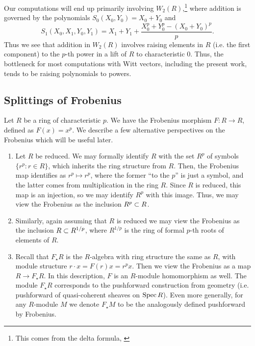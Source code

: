 \begin{rmk}
	\label{rmk:polyraise:w2}
    Our computations will end up primarily involving
    \(W_{2}(R)\),\footnote{
    This comes from the delta formula,
    \cite[Theorem~D]{kty-2022-fedder}}
    where addition is governed by the polynomials
	\(S_{0}(X_{0}, Y_{0}) = X_{0} + Y_{0}\)
	and
	\[
		S_{1}(X_{0}, X_{1}, Y_{0}, Y_{1})
		= X_{1} + Y_{1} + 
		\frac{X_{0}^{p} + Y_{0}^{p} - (X_{0} + Y_{0})^{p}}{p}
	.\]
	Thus we see that addition in \(W_{2}(R)\) involves raising
	elements in \(R\) (i.e. the first component) to the \(p\)-th
	power in a lift of \(R\) to characteristic 0.
    Thus, the bottleneck for most computations with Witt vectors,
    including the present work, tends to be raising
    polynomials to powers.
\end{rmk}

\subsection{Splittings of Frobenius}
\label{subsec:split:frob}

Let \(R\) be a ring of characteristic \(p\).
We have the Frobenius morphism
\(F \colon R \xrightarrow{} R\),
defined as \(F(x) = x^p\).
We describe a few alternative perspectives on
the Frobenius which will be useful later.

\begin{rmk}
	\label{rmk:frob:perspectives}
    \hfill
    \begin{enumerate}[(1)]
    	\item Let \(R\) be reduced.
            We may formally identify \(R\) with the set \(R^{p}\)
            of symbols \(\{r^{p} : r \in R\}\),
            which inherits the ring structure from \(R\).
            Then, the Frobenius map identifies as
            \(r^{p} \mapsto r^{p}\), where the former
            ``to the \(p\)'' is just a symbol, and the
            latter comes from multiplication in the ring \(R\).
            Since \(R\) is reduced, this map is an injection,
            so we may identify \(R^{p}\) with this image.
    		Thus, we may view the Frobenius as the inclusion
    		\(R^{p} \subset R\).
    	\item
            Similarly, again assuming that \(R\) is reduced
    		we may view the Frobenius as the inclusion
    		\(R \subset R^{1 / p}\), where \(R^{1 / p}\)
    		is the ring of formal \(p\)-th roots of elements
    		of \(R\).
        \item Recall that \(F_{\star}R\) is the \(R\)-algebra with ring structure
			the same as \(R\), with module structure
			\(r \cdot x = F(r)x = r^{p}x\).
			Then we view the Frobenius as a map
			\(R \xrightarrow{} F_{\star}R\).
			In this description, \(F\) is an \(R\)-module
			homomorphism as well.
			The module \(F_{\star}R\) corresponds to the
			pushforward construction from geometry
			(i.e. pushforward of quasi-coherent
			sheaves on \(\operatorname{Spec} R\)).
			Even more generally, for any \(R\)-module
			\(M\) we denote \(F_{\star}M\) to be
			the analogously defined pushforward by
			Frobenius.
    \end{enumerate}
\end{rmk}

